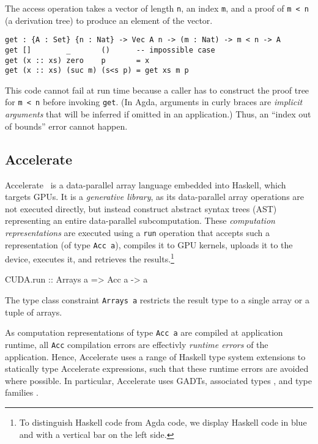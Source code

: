 \documentclass{llncs}
\begin{document}
The access operation takes a vector of length \verb+n+, an index
\verb+m+, and a proof of \verb+m < n+ (a derivation tree) to produce
an element of the vector.  
\begin{verbatim}
get : {A : Set} {n : Nat} -> Vec A n -> (m : Nat) -> m < n -> A
get []        _       ()      -- impossible case
get (x :: xs) zero    p       = x
get (x :: xs) (suc m) (s<s p) = get xs m p
\end{verbatim}
This code cannot fail at run time because a caller has to
construct the proof tree for \verb+m < n+ before invoking
\verb+get+. (In Agda, arguments in curly braces are \emph{implicit
  arguments} that will be inferred if omitted in an application.)
Thus, an ``index out of bounds'' error cannot happen.

\subsection{Accelerate}
\label{sec:accelerate}

Accelerate~\cite{ChakravartyKellerLeeMcdonellGrover2011} is a
data-parallel array language embedded into Haskell, which targets
GPUs. It is a \emph{generative library}, as its data-parallel array
operations are not executed directly, but instead construct abstract
syntax trees (AST) representing an entire data-parallel
subcomputation. These \emph{computation representations} are executed
using a \verb+run+ operation that accepts such a representation (of type
\verb+Acc a+), compiles it to GPU kernels, uploads it to the device,
executes it, and retrieves the results.\footnote{To distinguish
  Haskell code from Agda code, we display Haskell code in blue and with
  a vertical bar on the left side.}
%
\begin{hcode}
CUDA.run :: Arrays a => Acc a -> a
\end{hcode}
%
The type class constraint \verb+Arrays a+ restricts the result type to a single array or a tuple of arrays.

As computation representations of type \verb+Acc a+ are compiled at application runtime, all \verb+Acc+ compilation errors are effectivly \emph{runtime errors} of the application. Hence, Accelerate uses a range of Haskell type system extensions to statically type Accelerate expressions, such that these runtime errors are avoided where possible. In particular, Accelerate uses GADTs\cite{PeytonJonesVytiniotisWeirichWashburn2006}, associated types
\cite{ChakravartyKellerJones2005}, and type families
\cite{SchrijversPeytonJonesChakravartySulzmann2008}. 
\end{document}
